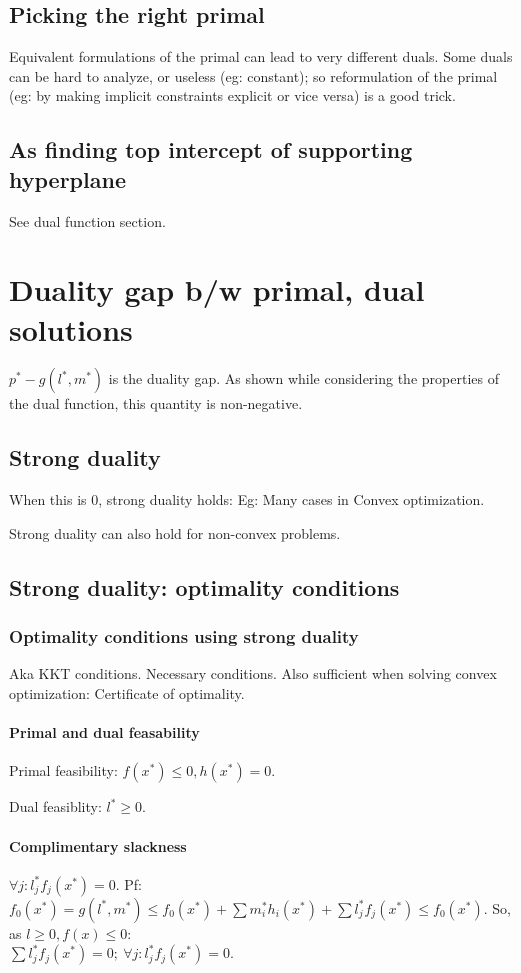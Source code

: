 \documentclass[oneside, article]{memoir}
\begin{document}
\subsection{Picking the right primal}
Equivalent formulations of the primal can lead to very different duals. Some duals can be hard to analyze, or useless (eg: constant); so reformulation of the primal (eg: by making implicit constraints explicit or vice versa) is a good trick.

\subsection{As finding top intercept of supporting hyperplane}
See dual function section.

\section{Duality gap b/w primal, dual solutions}
$p^{*} - g(l^{*}, m^{*})$ is the duality gap. As shown while considering the properties of the dual function, this quantity is non-negative.

\subsection{Strong duality}
When this is 0, strong duality holds: Eg: Many cases in Convex optimization.

Strong duality can also hold for non-convex problems.

\subsection{Strong duality: optimality conditions}
\subsubsection{Optimality conditions using strong duality}
Aka KKT conditions. Necessary conditions. Also sufficient when solving convex optimization: Certificate of optimality.

\paragraph{Primal and dual feasability}
Primal feasibility: $f(x^{*}) \leq 0, h(x^{*}) = 0$.

Dual feasiblity: $l^{*} \geq 0$.

\paragraph{Complimentary slackness}
$\forall j: l_{j}^{*}f_{j}(x^{*}) = 0$. Pf: $f_0(x^*) = g(l^{*}, m^{*}) \leq f_0(x^*) + \sum m_{i}^{*}h_{i}(x^{*}) + \sum l_{j}^{*}f_{j}(x^{*}) \leq f_0(x^*)$. So, as $l\geq 0, f(x) \leq 0$: \\
$\sum l_{j}^{*}f_{j}(x^{*}) = 0;\ \forall j: l_{j}^{*}f_{j}(x^{*}) = 0$.
 
\end{document}
